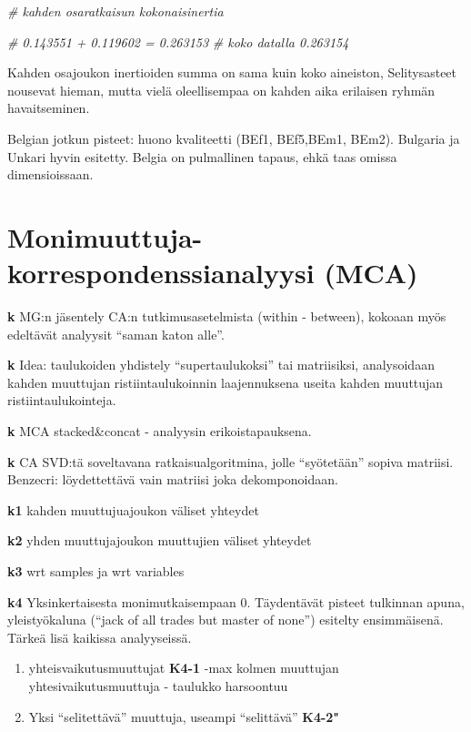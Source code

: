\documentclass[
  finnish,
]{book}
\newenvironment{Shaded}{\begin{snugshade}}{\end{snugshade}}
\newcommand{\CommentTok}[1]{\textcolor[rgb]{0.56,0.35,0.01}{\textit{#1}}}
\begin{document}
\begin{Shaded}
\begin{Highlighting}[]
\CommentTok{# kahden osaratkaisun kokonaisinertia}

\CommentTok{# 0.143551 + 0.119602 = 0.263153}
\CommentTok{# koko datalla 0.263154}
\end{Highlighting}
\end{Shaded}

Kahden osajoukon inertioiden summa on sama kuin koko aineiston, Selitysasteet
nousevat hieman, mutta vielä oleellisempaa on kahden aika erilaisen ryhmän
havaitseminen.

Belgian jotkun pisteet: huono kvaliteetti (BEf1, BEf5,BEm1, BEm2). Bulgaria ja
Unkari hyvin esitetty. Belgia on pulmallinen tapaus, ehkä taas omissa dimensioissaan.

\hypertarget{monimuuttuja-korrespondenssianalyysi-mca}{%
\chapter{Monimuuttuja-korrespondenssianalyysi (MCA)}\label{monimuuttuja-korrespondenssianalyysi-mca}}

\textbf{k} MG:n jäsentely CA:n tutkimusasetelmista (within - between), kokoaan myös
edeltävät analyysit ``saman katon alle''.

\textbf{k} Idea: taulukoiden yhdistely ``supertaulukoksi'' tai matriisiksi, analysoidaan kahden muuttujan
ristiintaulukoinnin laajennuksena useita kahden muuttujan ristiintaulukointeja.

\textbf{k} MCA stacked\&concat - analyysin erikoistapauksena.

\textbf{k} CA SVD:tä soveltavana ratkaisualgoritmina, jolle ``syötetään'' sopiva matriisi. Benzecri: löydettettävä vain
matriisi joka dekomponoidaan.

\textbf{k1} kahden muuttujuajoukon väliset yhteydet

\textbf{k2} yhden muuttujajoukon muuttujien väliset yhteydet

\textbf{k3} wrt samples ja wrt variables

\textbf{k4} Yksinkertaisesta monimutkaisempaan
0. Täydentävät pisteet tulkinnan apuna, yleistyökaluna (``jack of all trades but
master of none'') esitelty ensimmäisenä. Tärkeä lisä kaikissa analyyseissä.

\begin{enumerate}
\def\labelenumi{\arabic{enumi}.}
\item
  yhteisvaikutusmuuttujat \textbf{K4-1}
  -max kolmen muuttujan yhtesivaikutusmuuttuja - taulukko harsoontuu
\item
  Yksi ``selitettävä'' muuttuja, useampi ``selittävä'' \textbf{K4-2"}
\end{enumerate}
\end{document}
